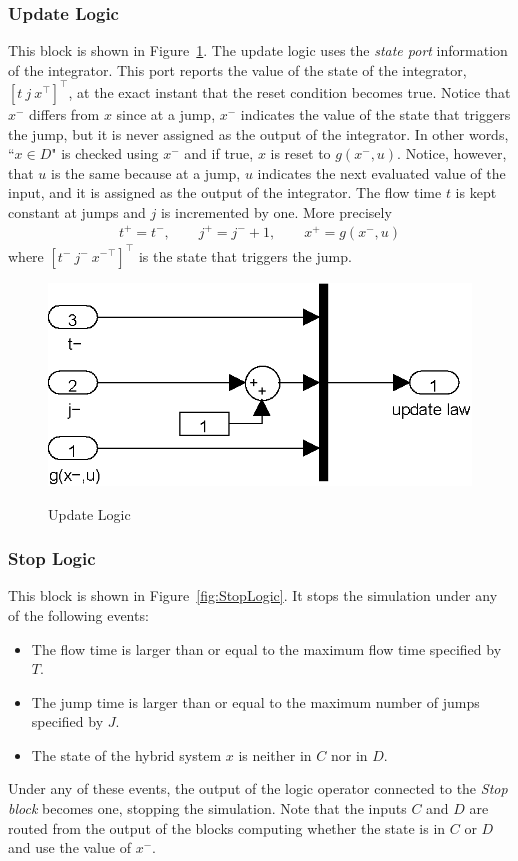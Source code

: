 \documentclass{article}
\begin{document}
\subsubsection{Update Logic}

This block is shown in Figure~\ref{fig:UpdateLogic}. 
The update logic uses the {\em state port} information of the integrator. 
This port reports the value of the state of the integrator, $[t\ j\ x^\top]^\top$, 
at the exact instant that the reset condition becomes true. 
Notice that $x^-$ differs from $x$ since at a jump, 
$x^-$ indicates the value of the state that triggers the jump, 
but it is never assigned as the output of the integrator. 
In other words, ``$x \in D$" is checked using $x^-$ and if true, 
$x$ is reset to $g(x^-,u)$. Notice, however, that $u$ is the same because at a jump, 
$u$ indicates the next evaluated value of the input, 
and it is assigned as the output of the integrator. 
The flow time $t$ is kept constant at jumps and $j$ is incremented by one. 
More precisely
\begin{eqnarray*}
t^+=t^-, \qquad j^+=j^-+1,\qquad x^+=g(x^-,u)
\end{eqnarray*}
where $[t^-\ j^-\ {x^-}^\top]^\top$ is the state that triggers the jump.

\begin{figure}[ht]
  \begin{center}
    {\includegraphics[width=.4\textwidth]{figures/Simulink/UpdateLogic.eps}}
   \caption{Update Logic}
\label{fig:UpdateLogic}
  \end{center}
\end{figure}




\subsubsection{Stop Logic}

This block is shown in Figure~\ref{fig:StopLogic}. 
It stops the simulation under any of the
following events:
\begin{itemize}
\item The flow time is larger than or equal to the maximum flow time specified by $T$.
\item The jump time is larger than or equal to the maximum number of jumps specified by $J$.
\item The state of the hybrid system $x$ is neither in $C$ nor in $D$.
\end{itemize}
Under any of these events, the output of the logic operator
connected to the {\em Stop block} becomes one, stopping the simulation.
Note that the inputs $C$ and $D$ are routed from the output of the blocks 
computing whether the state is in $C$ or $D$ and use the value of $x^-$.
\end{document}
